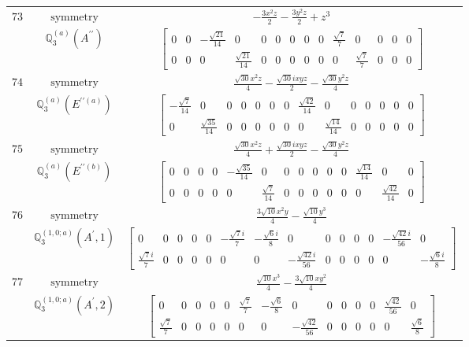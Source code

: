 \documentclass[fleqn,8pt,landscape]{jsarticle}
\begin{document}
\begin{longtable}{ccc}
$ 73 $ & $ \text{symmetry} $ & $ - \frac{3 x^{2} z}{2} - \frac{3 y^{2} z}{2} + z^{3} $ \\
$  $ & $ \mathbb{Q}_{3}^{(a)}(A^{\prime\prime}) $ & $ \begin{bmatrix} 0 & 0 & - \frac{\sqrt{21}}{14} & 0 & 0 & 0 & 0 & 0 & 0 & \frac{\sqrt{7}}{7} & 0 & 0 & 0 & 0 \\ 0 & 0 & 0 & \frac{\sqrt{21}}{14} & 0 & 0 & 0 & 0 & 0 & 0 & \frac{\sqrt{7}}{7} & 0 & 0 & 0 \end{bmatrix} $ \\ \hline
$ 74 $ & $ \text{symmetry} $ & $ \frac{\sqrt{30} x^{2} z}{4} - \frac{\sqrt{30} i x y z}{2} - \frac{\sqrt{30} y^{2} z}{4} $ \\
$  $ & $ \mathbb{Q}_{3}^{(a)}(E^{\prime\prime(a)}) $ & $ \begin{bmatrix} - \frac{\sqrt{7}}{14} & 0 & 0 & 0 & 0 & 0 & 0 & \frac{\sqrt{42}}{14} & 0 & 0 & 0 & 0 & 0 & 0 \\ 0 & \frac{\sqrt{35}}{14} & 0 & 0 & 0 & 0 & 0 & 0 & \frac{\sqrt{14}}{14} & 0 & 0 & 0 & 0 & 0 \end{bmatrix} $ \\ \hline
$ 75 $ & $ \text{symmetry} $ & $ \frac{\sqrt{30} x^{2} z}{4} + \frac{\sqrt{30} i x y z}{2} - \frac{\sqrt{30} y^{2} z}{4} $ \\
$  $ & $ \mathbb{Q}_{3}^{(a)}(E^{\prime\prime(b)}) $ & $ \begin{bmatrix} 0 & 0 & 0 & 0 & - \frac{\sqrt{35}}{14} & 0 & 0 & 0 & 0 & 0 & 0 & \frac{\sqrt{14}}{14} & 0 & 0 \\ 0 & 0 & 0 & 0 & 0 & \frac{\sqrt{7}}{14} & 0 & 0 & 0 & 0 & 0 & 0 & \frac{\sqrt{42}}{14} & 0 \end{bmatrix} $ \\ \hline
$ 76 $ & $ \text{symmetry} $ & $ \frac{3 \sqrt{10} x^{2} y}{4} - \frac{\sqrt{10} y^{3}}{4} $ \\
$  $ & $ \mathbb{Q}_{3}^{(1,0;a)}(A^{\prime},1) $ & $ \begin{bmatrix} 0 & 0 & 0 & 0 & 0 & - \frac{\sqrt{7} i}{7} & - \frac{\sqrt{6} i}{8} & 0 & 0 & 0 & 0 & 0 & - \frac{\sqrt{42} i}{56} & 0 \\ \frac{\sqrt{7} i}{7} & 0 & 0 & 0 & 0 & 0 & 0 & - \frac{\sqrt{42} i}{56} & 0 & 0 & 0 & 0 & 0 & - \frac{\sqrt{6} i}{8} \end{bmatrix} $ \\ \hline
$ 77 $ & $ \text{symmetry} $ & $ \frac{\sqrt{10} x^{3}}{4} - \frac{3 \sqrt{10} x y^{2}}{4} $ \\
$  $ & $ \mathbb{Q}_{3}^{(1,0;a)}(A^{\prime},2) $ & $ \begin{bmatrix} 0 & 0 & 0 & 0 & 0 & \frac{\sqrt{7}}{7} & - \frac{\sqrt{6}}{8} & 0 & 0 & 0 & 0 & 0 & \frac{\sqrt{42}}{56} & 0 \\ \frac{\sqrt{7}}{7} & 0 & 0 & 0 & 0 & 0 & 0 & - \frac{\sqrt{42}}{56} & 0 & 0 & 0 & 0 & 0 & \frac{\sqrt{6}}{8} \end{bmatrix} $ \\ \hline

\end{longtable}
\end{document}
